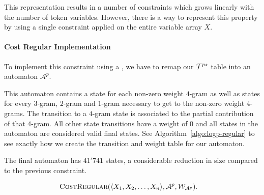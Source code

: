 \documentclass[../Document.tex]{subfiles}
\begin{document}
This representation results in a number of constraints which grows linearly with the number of token variables. However, there is a way to represent this property by using a single \costregular constraint applied on the entire variable array $X$.






\paragraph{Cost Regular Implementation}
To implement this constraint using a \costregular, we have to remap our ${\cal T}^{p\star}$ table into an automaton $\mathcal{A}^p$.

This automaton contains a state for each non-zero weight $4$-gram as well as states for every $3$-gram, $2$-gram and $1$-gram necessary to get to the non-zero weight $4$-grams.
The transition to a $4$-gram state is associated to the partial contribution of that $4$-gram.
All other state transitions have a weight of 0 and all states in the automaton are considered valid final states.
See Algorithm~\ref{algo:logp-regular} to see exactly how we create the transition and weight table for our automaton.

The final automaton has $41'741$ states, a considerable reduction in size compared to the previous \shortTable constraint.

\begin{align*}
    &\mbox{\sc CostRegular}(\langle X_1, X_2, \ldots, X_n \rangle, \mathcal{A}^p, {\cal W}_{\mathcal{A}^p}).
\end{align*}
\end{document}
